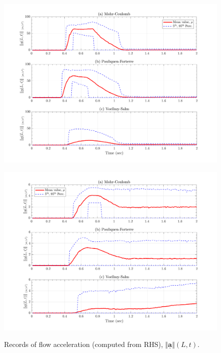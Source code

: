 \documentclass{article}
\begin{document}
\begin{figure}[H]
	\begin{minipage}[b]{0.5\linewidth}
    	\centering
    	\includegraphics[width=1\textwidth]{InclinedPlane/Acceleration/accel_L3R.png}
    	\label{fig:Ramp-L3-AccR}
	\end{minipage}
	\begin{minipage}[b]{0.5\linewidth}
		\centering
		\includegraphics[width=1\textwidth]{InclinedPlane/Acceleration/accel_L4R.png}
    	\label{fig:Ramp-L4-AccR}
    \end{minipage}
    \caption{Records of flow acceleration (computed from RHS), $\Vert \underline{\mathbf{a}} \Vert(L,t)$.}
    \label{fig:Ramp-LM-AccR}
\end{figure}
\end{document}
